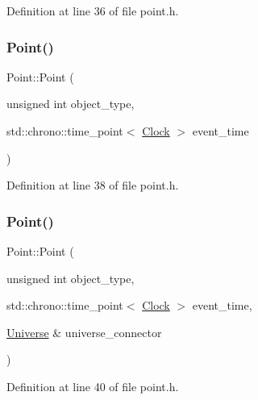 Definition at line 36 of file point.\+h.

\mbox{\label{class_point_ac3e6d30951c40e5bc5dafe6c90668b3f}} 
\subsubsection{\texorpdfstring{Point()}{Point()}\hspace{0.1cm}{\footnotesize\ttfamily [3/4]}}
{\footnotesize\ttfamily Point\+::\+Point (\begin{DoxyParamCaption}\item[{unsigned int}]{object\+\_\+type,  }\item[{std\+::chrono\+::time\+\_\+point$<$ \hyperlink{universe_8h_a0ef8d951d1ca5ab3cfaf7ab4c7a6fd80}{Clock} $>$}]{event\+\_\+time }\end{DoxyParamCaption})\hspace{0.3cm}{\ttfamily [inline]}}



Definition at line 38 of file point.\+h.

\mbox{\label{class_point_abbc76ed1b437c982eb607ec165ecfa47}} 
\subsubsection{\texorpdfstring{Point()}{Point()}\hspace{0.1cm}{\footnotesize\ttfamily [4/4]}}
{\footnotesize\ttfamily Point\+::\+Point (\begin{DoxyParamCaption}\item[{unsigned int}]{object\+\_\+type,  }\item[{std\+::chrono\+::time\+\_\+point$<$ \hyperlink{universe_8h_a0ef8d951d1ca5ab3cfaf7ab4c7a6fd80}{Clock} $>$}]{event\+\_\+time,  }\item[{\hyperlink{class_universe}{Universe} \&}]{universe\+\_\+connector }\end{DoxyParamCaption})\hspace{0.3cm}{\ttfamily [inline]}}



Definition at line 40 of file point.\+h.

